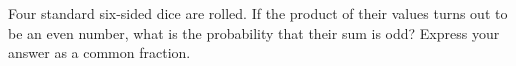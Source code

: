 Four standard six-sided dice are rolled. If the product of their values turns out to be an even number, what is the probability that their sum is odd? Express your answer as a common fraction.
